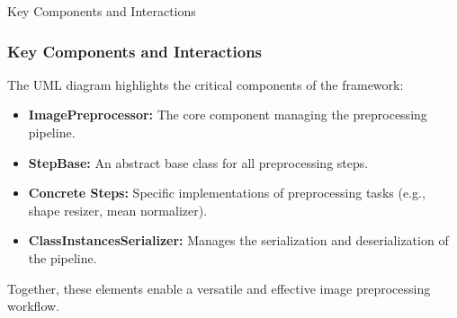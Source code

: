 \begin{frame}{Key Components and Interactions}
    \frametitle{Key Components and Interactions}
    The UML diagram highlights the critical components of the framework:
    \begin{itemize}
        \item \textbf{ImagePreprocessor:} The core component managing the preprocessing pipeline.
        \item \textbf{StepBase:} An abstract base class for all preprocessing steps.
        \item \textbf{Concrete Steps:} Specific implementations of preprocessing tasks (e.g., shape resizer, mean normalizer).
        \item \textbf{ClassInstancesSerializer:} Manages the serialization and deserialization of the pipeline.
    \end{itemize}
    Together, these elements enable a versatile and effective image preprocessing workflow.
\end{frame}
